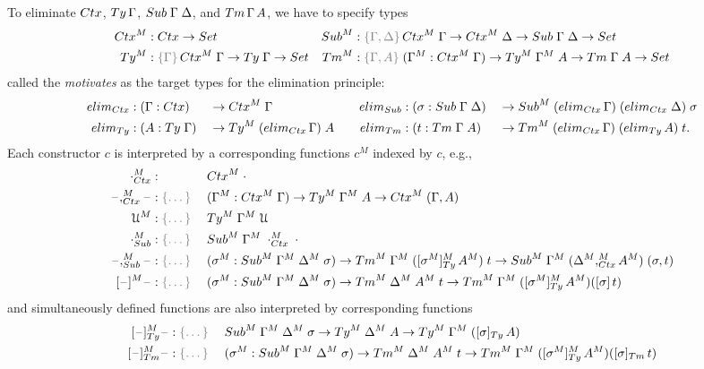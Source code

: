 \documentclass[a4paper,UKenglish,numberwithinsect,cleveref,thm-restate]{lipics-v2021}
\begin{document}
To eliminate $\Ctx$, $\Ty\,\Gamma$, $\Sub\;\Gamma\;\Delta$, and $\Tm\,\Gamma\,A$, we have to specify types
\begin{align*}
  \Ctx^M & : \Ctx \to \Set &
  \Sub^M & : \implicit{\Gamma, \Delta}\,\Ctx^M\;\Gamma \to \Ctx^M\;\Delta \to \Sub\;\Gamma\;\Delta \to \Set \\
  \Ty^M  & : \implicit{\Gamma}\,\Ctx^M\;\Gamma \to \Ty\;\Gamma \to \Set & 
  \Tm^M  & : \implicit{\Gamma, A}\; (\Gamma^M : \Ctx^M\;\Gamma) \to \Ty^M\;\Gamma^M\;A \to \Tm\;\Gamma\;A \to \Set
\end{align*}
called the \emph{motivates} as the target types for the elimination principle:
\begin{alignat*}{5}
  \elim_{\Ctx} & : (\Gamma : \Ctx)   && \to \Ctx^M\;\Gamma &
  \elim_{\Sub} & : (\sigma : \Sub\;\Gamma\;\Delta) && \to \Sub^M\;(\elim_{\Ctx}\,\Gamma)\;(\elim_{\Ctx}\;\Delta)\;\sigma \\
  \elim_{\Ty}  & : (A : \Ty\;\Gamma) && \to \Ty^M\;(\elim_{\Ctx}\,\Gamma)\;A \quad
               & \elim_{\Tm}  & : (t : \Tm\;\Gamma\;A) && \to \Tm^M\;(\elim_{\Ctx}\,\Gamma)\;(\elim_{\Ty}\,A)\;t.
\end{alignat*}
Each constructor $c$ is interpreted by a corresponding functions $c^M$ indexed by $c$, e.g.,\ 
\begin{alignat*}{3}
  \emptyctx_{\Ctx}^M     & :                    && \Ctx^M\;\emptyctx \\
  \blank,_{\Ctx}^M\blank & : \implicit{\dots}\; && (\Gamma^M : \Ctx^M\;\Gamma) \to \Ty^M\;\Gamma^M\;A \to \Ctx^M\;(\Gamma, A) \\
  \UU^M & : \implicit{\dots} && \Ty^M\;\Gamma^M\;\UU \\
  \emptysub_{\Sub}^M     & : \implicit{\dots}   && \Sub^M\;\Gamma^M\;\emptyctx_{\Ctx}^M\;\cdot \\
  \blank,_{\Sub}^M\blank & : \implicit{\dots}   && (\sigma^M : \Sub^M\;\Gamma^M\;\Delta^M\;\sigma) \to \Tm^M\;\Gamma^M\;([\sigma^M]^M_{\Ty}\,A^M)\;t \to \Sub^M\;\Gamma^M\;(\Delta^M ,^M_{\Ctx} A^M)\;(\sigma, t) \\
  [\blank]^M\blank & : \implicit{\dots} && (\sigma^M : \Sub^M\;\Gamma^M\;\Delta^M\;\sigma) \to \Tm^M\;\Delta^M\;A^M\;t \to \Tm^M\;\Gamma^M\;([\sigma^M]_{\Ty}^M\,A^M)([\sigma]\,t)
\end{alignat*}
and simultaneously defined functions are also interpreted by corresponding functions 
\begin{alignat*}{3}
  [\blank]_{\Ty}^M\blank & : \implicit{\dots} \; && \Sub^M\;\Gamma^M\;\Delta^M\;\sigma \to \Ty^M\;\Delta^M\;A \to \Ty^M\;\Gamma^M\;([\sigma]_{\Ty}\,A) \\
  [\blank]_{\Tm}^M\blank & : \implicit{\dots} && (\sigma^M : \Sub^M\;\Gamma^M\;\Delta^M\;\sigma) \to \Tm^M\;\Delta^M\;A^M\;t \to \Tm^M\;\Gamma^M\;([\sigma^M]_{\Ty}^M\,A^M)([\sigma]_{\Tm}\,t)
\end{alignat*}
\end{document}
